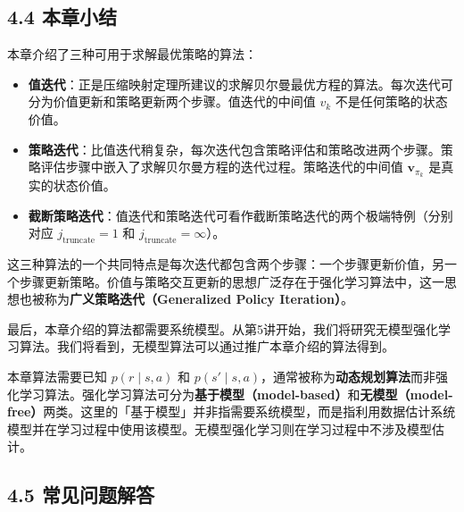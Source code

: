 \documentclass[UTF8]{article}
\begin{document}
\subsection*{4.4 本章小结}

本章介绍了三种可用于求解最优策略的算法：

\begin{itemize}
    \item \textbf{值迭代}：正是压缩映射定理所建议的求解贝尔曼最优方程的算法。每次迭代可分为价值更新和策略更新两个步骤。值迭代的中间值 $v_k$ 不是任何策略的状态价值。
    \item \textbf{策略迭代}：比值迭代稍复杂，每次迭代包含策略评估和策略改进两个步骤。策略评估步骤中嵌入了求解贝尔曼方程的迭代过程。策略迭代的中间值 $\boldsymbol{v}_{\pi_k}$ 是真实的状态价值。
    \item \textbf{截断策略迭代}：值迭代和策略迭代可看作截断策略迭代的两个极端特例（分别对应 $j_{\text{truncate}} = 1$ 和 $j_{\text{truncate}} = \infty$）。
\end{itemize}

这三种算法的一个共同特点是每次迭代都包含两个步骤：一个步骤更新价值，另一个步骤更新策略。价值与策略交互更新的思想广泛存在于强化学习算法中，这一思想也被称为\textbf{广义策略迭代（Generalized Policy Iteration）}。

最后，本章介绍的算法都需要系统模型。从第5讲开始，我们将研究无模型强化学习算法。我们将看到，无模型算法可以通过推广本章介绍的算法得到。

\begin{remarkbox}
本章算法需要已知 $p(r \mid s,a)$ 和 $p(s' \mid s,a)$，通常被称为\textbf{动态规划算法}而非强化学习算法。强化学习算法可分为\textbf{基于模型（model-based）}和\textbf{无模型（model-free）}两类。这里的「基于模型」并非指需要系统模型，而是指利用数据估计系统模型并在学习过程中使用该模型。无模型强化学习则在学习过程中不涉及模型估计。
\end{remarkbox}

\subsection*{4.5 常见问题解答}
\end{document}
